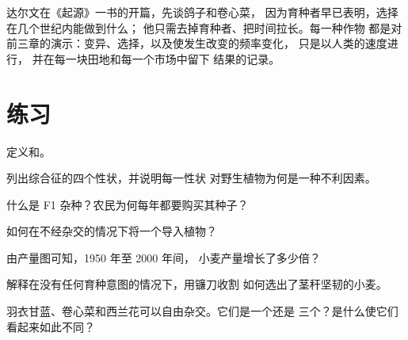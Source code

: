 \begin{remark}[最古老的演化实验]\label{rem:g12:domesticated-plants:oldest}
达尔文在《起源》一书的开篇，先谈鸽子和卷心菜，
因为育种者早已表明，选择在几个世纪内能做到什么；
他只需去掉育种者、把时间拉长。每一种作物
都是对前三章的演示：变异、选择，以及使发生改变的频率变化，
只是以人类的速度进行，
并在每一块田地和每一个市场中留下
结果的记录。
\end{remark}

\section{练习}

\begin{exercise}[$\star$]\label{exo:g12:domesticated-plants:1}
定义和。
\end{exercise}

\begin{exercise}[$\star$]\label{exo:g12:domesticated-plants:2}
列出综合征的四个性状，并说明每一性状
对野生植物为何是一种不利因素。
\end{exercise}

\begin{exercise}[$\star$]\label{exo:g12:domesticated-plants:3}
什么是 F1 杂种？农民为何每年都要购买其种子？
\end{exercise}

\begin{exercise}[$\star$]\label{exo:g12:domesticated-plants:4}
如何在不经杂交的情况下将一个导入植物？
\end{exercise}

\begin{exercise}[$\star$]\label{exo:g12:domesticated-plants:5}
由产量图可知，1950 年至 2000 年间，
小麦产量增长了多少倍？
\end{exercise}

\begin{exercise}[$\star\star$]\label{exo:g12:domesticated-plants:6}
解释在没有任何育种意图的情况下，用镰刀收割
如何选出了茎秆坚韧的小麦。
\end{exercise}

\begin{exercise}[$\star\star$]\label{exo:g12:domesticated-plants:7}
羽衣甘蓝、卷心菜和西兰花可以自由杂交。它们是一个还是
三个？是什么使它们看起来如此不同？
\end{exercise}

